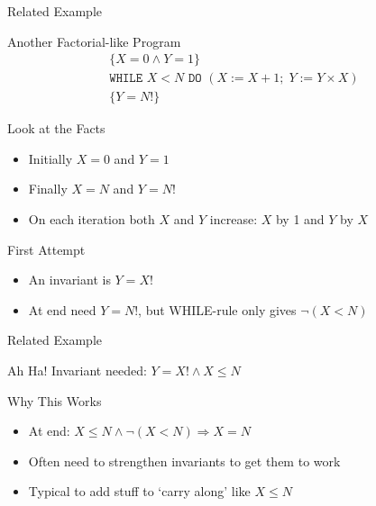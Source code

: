 \begin{frame}{Related Example}
    \begin{block}{Another Factorial-like Program}
        \begin{align*}
        \{X=0 \wedge Y=1\} \\
        \texttt{WHILE } X < N \texttt{ DO } (X:=X+1; \; Y:=Y \times X) \\
        \{Y=N!\}
        \end{align*}
    \end{block}

    \begin{block}{Look at the Facts}
        \begin{itemize}
            \item Initially $X=0$ and $Y=1$
            \item Finally $X=N$ and $Y=N!$
            \item On each iteration both $X$ and $Y$ increase: $X$ by 1 and $Y$ by $X$
        \end{itemize}
    \end{block}

    \begin{block}{First Attempt}
        \begin{itemize}
            \item An invariant is $Y = X!$
            \item At end need $Y = N!$, but WHILE-rule only gives $\neg(X<N)$
        \end{itemize}
    \end{block}

\end{frame}
\begin{frame}{Related Example}
    \begin{alertblock}{Ah Ha!}
        Invariant needed: $Y = X! \wedge X \leq N$
    \end{alertblock}

    \begin{block}{Why This Works}
        \begin{itemize}
            \item At end: $X \leq N \wedge \neg(X<N) \Rightarrow X=N$
            \item Often need to strengthen invariants to get them to work
            \item Typical to add stuff to `carry along' like $X \leq N$
        \end{itemize}
    \end{block}
\end{frame}